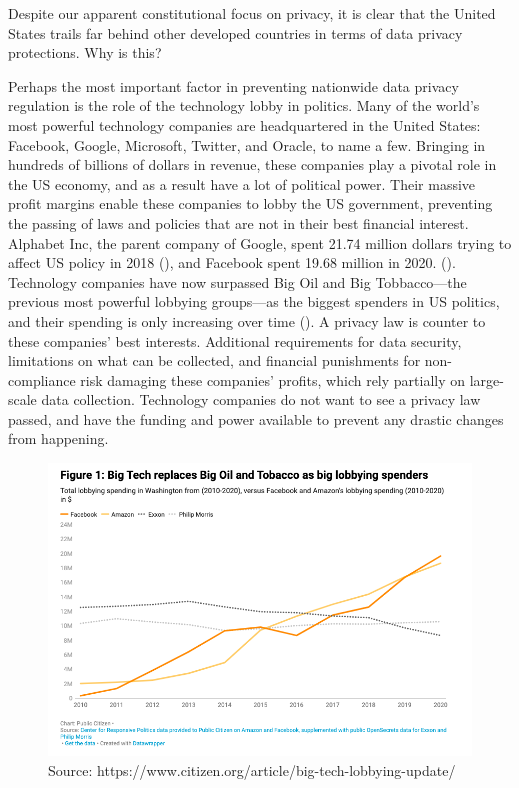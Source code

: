 \documentclass[water,article,submit,moreauthors,pdftex]{mdpi}
\begin{document}
Despite our apparent constitutional focus on privacy, it is clear that
the United States trails far behind other developed countries in terms
of data privacy protections. Why is this?

Perhaps the most important factor in preventing nationwide data privacy
regulation is the role of the technology lobby in politics. Many of the
world's most powerful technology companies are headquartered in the
United States: Facebook, Google, Microsoft, Twitter, and Oracle, to name
a few. Bringing in hundreds of billions of dollars in revenue, these
companies play a pivotal role in the US economy, and as a result have a
lot of political power. Their massive profit margins enable these
companies to lobby the US government, preventing the passing of laws and
policies that are not in their best financial interest. Alphabet Inc,
the parent company of Google, spent 21.74 million dollars trying to
affect US policy in 2018 (\citet{tech-lobby}), and Facebook spent 19.68
million in 2020. (\citet{citizen-tech}). Technology companies have now
surpassed Big Oil and Big Tobbacco---the previous most powerful lobbying
groups---as the biggest spenders in US politics, and their spending is
only increasing over time (\citet{citizen-tech}). A privacy law is
counter to these companies' best interests. Additional requirements for
data security, limitations on what can be collected, and financial
punishments for non-compliance risk damaging these companies' profits,
which rely partially on large-scale data collection. Technology
companies do not want to see a privacy law passed, and have the funding
and power available to prevent any drastic changes from happening.

\begin{figure}[H]
\includegraphics[width=1\linewidth]{lobby-spending} \caption{Source: https://www.citizen.org/article/big-tech-lobbying-update/}\label{fig:unnamed-chunk-1}
\end{figure}
\end{document}

